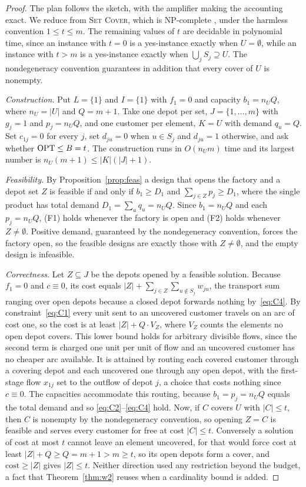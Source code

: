 \begin{proof}
The plan follows the sketch, with the amplifier making the accounting
exact. We reduce from \textsc{Set Cover}, which is NP-complete
\citep{Karp1972}, under the harmless convention $1\le t\le m$. The
remaining values of $t$ are decidable in polynomial time, since an
instance with $t=0$ is a yes-instance exactly when $U=\emptyset$, while
an instance with $t>m$ is a yes-instance exactly when
$\bigcup_j S_j\supseteq U$. The nondegeneracy convention guarantees in
addition that every cover of $U$ is nonempty.

\emph{Construction.} Put $L=\{1\}$ and $I=\{1\}$ with $f_1=0$ and
capacity $b_1=n_U Q$, where $n_U=|U|$ and $Q=m+1$. Take one depot per
set, $J=\{1,\dots,m\}$ with $g_j=1$ and $p_j=n_U Q$, and one customer per
element, $K=U$ with demand $q_u=Q$. Set $c_{1j}=0$ for every $j$, set
$d_{ju}=0$ when $u\in S_j$ and $d_{ju}=1$ otherwise, and ask whether
$\mathrm{OPT}\le B=t$. The construction runs in $O(n_U m)$ time and its largest
number is $n_U(m+1)\le|K|(|J|+1)$.

\emph{Feasibility.} By Proposition~\ref{prop:feas} a design that opens the
factory and a depot set $Z$ is feasible if and only if $b_1\ge D_1$ and
$\sum_{j\in Z}p_j\ge D_1$, where the single product has total demand
$D_1=\sum_u q_u=n_U Q$. Since $b_1=n_U Q$ and each $p_j=n_U Q$, (F1) holds
whenever the factory is open and (F2) holds whenever $Z\ne\emptyset$.
Positive demand, guaranteed by the nondegeneracy convention, forces the
factory open, so the feasible designs are
exactly those with $Z\ne\emptyset$, and the empty design is infeasible.

\emph{Correctness.} Let $Z\subseteq J$ be the depots opened by a feasible
solution. Because $f_1=0$ and $c\equiv 0$, its cost equals
$|Z|+\sum_{j\in Z}\sum_{u\notin S_j}w_{ju}$, the transport sum ranging
over open depots because a closed depot forwards nothing
by~\eqref{eq:C4}. By constraint~\eqref{eq:C1} every unit sent to an
uncovered customer travels on an arc of cost one, so the cost is at least
$|Z|+Q\cdot V_Z$, where $V_Z$ counts the elements no open depot covers.
This lower bound holds for arbitrary divisible flows, since the second
term is charged one unit per unit of flow and an uncovered customer has
no cheaper arc available. It is attained by routing each covered
customer through a covering depot and each uncovered one through any open
depot, with the first-stage flow $x_{1j}$ set to the outflow of depot
$j$, a choice that costs nothing since $c\equiv 0$. The capacities
accommodate this routing, because $b_1=p_j=n_UQ$ equals the total demand
and so \eqref{eq:C2}--\eqref{eq:C4} hold. Now, if $C$ covers
$U$ with $|C|\le t$, then $C$ is nonempty by the nondegeneracy
convention, so opening $Z=C$ is feasible and serves every customer
for free at cost $|C|\le t$. Conversely a solution of cost at most $t$ cannot leave an
element uncovered, for that would force cost at least
$|Z|+Q\ge Q=m+1>m\ge t$, so its open depots form a cover, and
$\text{cost}\ge|Z|$ gives $|Z|\le t$. Neither direction used any
restriction beyond the budget, a fact that Theorem~\ref{thm:w2} reuses
when a cardinality bound is added.


\end{proof}

